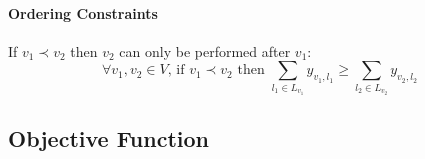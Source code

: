 \paragraph{Ordering Constraints}

If $v_1 \prec v_2$ then $v_2$ can only be performed after $v_1$:
\begin{equation}\label{eq:mbip5}
    \forall v_1, v_2 \in V,\, \text{if } v_1 \prec v_2 \text{ then }
    \sum_{l_1 \in L_{v_1}} y_{v_1, l_1} \geq \sum_{l_2 \in L_{v_2}} y_{v_2, l_2}
\end{equation}

\subsection{Objective Function}\label{sec:ofmarsc}


